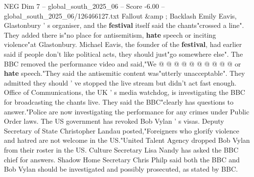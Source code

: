 \begin{textsample}{NEG Dim 7 – global\_south\_2025\_06 – Score -6.00 – global\_south\_2025\_06/126466127.txt}
Fallout \&amp ; Backlash Emily Eavis, Glastonbury ' s organiser, and the \textbf{festival} itself said the chants"crossed a line".
They added there is"no place for antisemitism, \textbf{hate} speech or inciting violence"at Glastonbury.
Michael Eavis, the founder of the \textbf{festival}, had earlier said if people don't like political acts, they should just"go somewhere else".
The BBC removed the performance video and said,"We @ @ @ @ @ @ @ @ @ @ or \textbf{hate} speech."They said the antisemitic content was"utterly unacceptable".
They admitted they should ' ve stopped the live stream but didn't act fast enough.
Office of Communications, the UK ' s media watchdog, is investigating the BBC for broadcasting the chants live.
They said the BBC"clearly has questions to answer."Police are now investigating the performance for any crimes under Public Order laws.
The US government has revoked Bob Vylan ' s visas.
Deputy Secretary of State Christopher Landau posted,"Foreigners who glorify violence and hatred are not welcome in the US."United Talent Agency dropped Bob Vylan from their roster in the US.
Culture Secretary Lisa Nandy has asked the BBC chief for answers.
Shadow Home Secretary Chris Philp said both the BBC and Bob Vylan should be investigated and possibly prosecuted, as stated by BBC.

\end{textsample}
